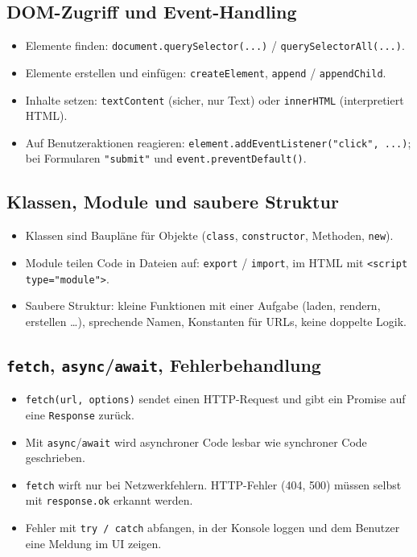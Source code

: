 \documentclass[a4paper,12pt]{article}
\begin{document}
\subsection*{DOM-Zugriff und Event-Handling}
\begin{itemize}
    \item Elemente finden: \texttt{document.querySelector(...)} / \texttt{querySelectorAll(...)}.
    \item Elemente erstellen und einfügen: \texttt{createElement}, \texttt{append} / \texttt{appendChild}.
    \item Inhalte setzen: \texttt{textContent} (sicher, nur Text) oder \texttt{innerHTML} (interpretiert HTML).
    \item Auf Benutzeraktionen reagieren: \texttt{element.addEventListener("click", ...)}; bei Formularen \texttt{"submit"} und \texttt{event.preventDefault()}.
\end{itemize}

\subsection*{Klassen, Module und saubere Struktur}
\begin{itemize}
    \item Klassen sind Baupläne für Objekte (\texttt{class}, \texttt{constructor}, Methoden, \texttt{new}).
    \item Module teilen Code in Dateien auf: \texttt{export} / \texttt{import}, im HTML mit \texttt{<script type="module">}.
    \item Saubere Struktur: kleine Funktionen mit einer Aufgabe (laden, rendern, erstellen \ldots), sprechende Namen, Konstanten für URLs, keine doppelte Logik.
\end{itemize}

\subsection*{\texttt{fetch}, \texttt{async}/\texttt{await}, Fehlerbehandlung}
\begin{itemize}
    \item \texttt{fetch(url, options)} sendet einen HTTP-Request und gibt ein Promise auf eine \texttt{Response} zurück.
    \item Mit \texttt{async}/\texttt{await} wird asynchroner Code lesbar wie synchroner Code geschrieben.
    \item \texttt{fetch} wirft nur bei Netzwerkfehlern. HTTP-Fehler (404, 500) müssen selbst mit \texttt{response.ok} erkannt werden.
    \item Fehler mit \texttt{try / catch} abfangen, in der Konsole loggen und dem Benutzer eine Meldung im UI zeigen.
\end{itemize}
\end{document}
